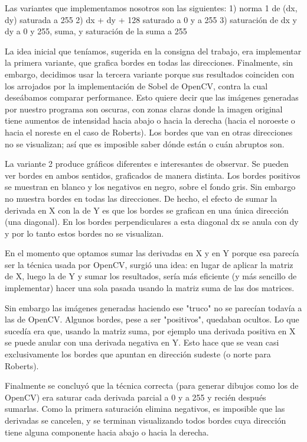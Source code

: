 Las variantes que implementamos nosotros son las siguientes:
    1) norma 1 de (dx, dy) saturada a 255
    2) dx + dy + 128 saturado a 0 y a 255
    3) saturación de dx y dy a 0 y 255, suma, y saturación de la suma a 255

La idea inicial que teníamos, sugerida en la consigna del trabajo, era implementar la primera variante, que grafica bordes en todas las direcciones. Finalmente, sin embargo, decidimos usar la tercera variante porque sus resultados coinciden con los arrojados por la implementación de Sobel de OpenCV, contra la cual deseábamos comparar performance. Esto quiere decir que las imágenes generadas por nuestro programa son oscuras, con zonas claras donde la imagen original tiene aumentos de intensidad hacia abajo o hacia la derecha (hacia el noroeste o hacia el noreste en el caso de Roberts). Los bordes que van en otras direcciones no se visualizan; así que es imposible saber dónde están o cuán abruptos son.

La variante 2 produce gráficos diferentes e interesantes de observar. Se pueden ver bordes en ambos sentidos, graficados de manera distinta. Los bordes positivos se muestran en blanco y los negativos en negro, sobre el fondo gris. Sin embargo no muestra bordes en todas las direcciones. De hecho, el efecto de sumar la derivada en X con la de Y es que los bordes se grafican en una única dirección (una diagonal). En los bordes perpendiculares a esta diagonal dx se anula con dy y por lo tanto estos bordes no se visualizan.

En el momento que optamos sumar las derivadas en X y en Y porque esa parecía ser la técnica usada por OpenCV, surgió una idea: en lugar de aplicar la matriz de X, luego la de Y y sumar los resultados, sería más eficiente (y más sencillo de implementar) hacer una sola pasada usando la matriz suma de las dos matrices.

Sin embargo las imágenes generadas haciendo ese "truco" no se parecían todavía a las de OpenCV. Algunos bordes, pese a ser "positivos", quedaban ocultos. Lo que sucedía era que, usando la matriz suma, por ejemplo una derivada positiva en X se puede anular con una derivada negativa en Y. Esto hace que se vean casi exclusivamente los bordes que apuntan en dirección sudeste (o norte para Roberts).

Finalmente se concluyó que la técnica correcta (para generar dibujos como los de OpenCV) era saturar cada derivada parcial a 0 y a 255 y recién después sumarlas. Como la primera saturación elimina negativos, es imposible que las derivadas se cancelen, y se terminan visualizando todos bordes cuya dirección tiene alguna componente hacia abajo o hacia la derecha.


